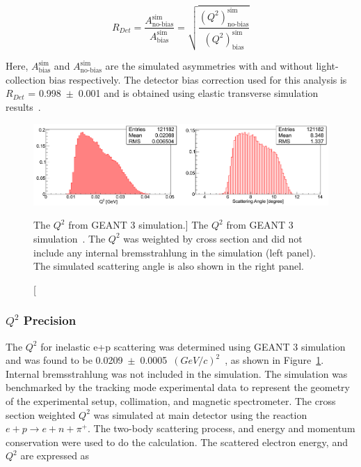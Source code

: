 \begin{equation} \label{equ:eqQ2Acceptance1}
R_{Det} = \frac{A_{\textrm{no-bias}}^{\textrm{sim}}}{A_{\textrm{bias}}^{\textrm{sim}}} = \sqrt{\frac{(Q^{2})_{\textrm{no-bias}}^{\textrm{sim}}}{(Q^{2})_{\textrm{bias}}^{\textrm{sim}}} }
\end{equation}

Here, $A^{\textrm{sim}}_{\textrm{bias}}$ and $A^{\textrm{sim}}_{\textrm{no-bias}}$ are the simulated asymmetries with and without light-collection bias respectively.
The detector bias correction used for this analysis is $R_{Det}$ = 0.998~$\pm$~0.001 and is obtained using elastic transverse simulation results~\cite{elog:peiqing_analysis589, buddhini_qweak}.

\begin{figure}[!h]
	\begin{center}
	\includegraphics[width=15.0cm]{figures/inelastic_Q2}
	\end{center}
	\caption
	[The $Q^{2}$ from GEANT 3 simulation.]
	{The $Q^{2}$ from GEANT 3 simulation~\cite{elog:nur_ancillary44}. The $Q^{2}$ was weighted by cross section and did not include any internal bremsstrahlung in the simulation (left panel). The simulated scattering angle is also shown in the right panel.}
	\label{fig:inelastic_Q2}
\end{figure}

\subsubsection{$Q^{2}$ Precision}
\label{Q2 Precision}

The $Q^{2}$ for inelastic e+p scattering was determined using GEANT 3 simulation and was found to be 0.0209~$\pm$~0.0005~$(GeV/c)^{2}$~\cite{elog:nur_ancillary44}, as shown in Figure~\ref{fig:inelastic_Q2}. Internal bremsstrahlung was not included in the simulation. The simulation was benchmarked by the tracking mode experimental data to represent the geometry of the experimental setup, collimation, and magnetic spectrometer.
The cross section weighted $Q^{2}$ was simulated at main detector using the reaction $e + p \rightarrow e + n + \pi^{+}$. The two-body scattering process, and energy and momentum conservation were used to do the calculation. The scattered electron energy, and $Q^{2}$ are expressed as 

